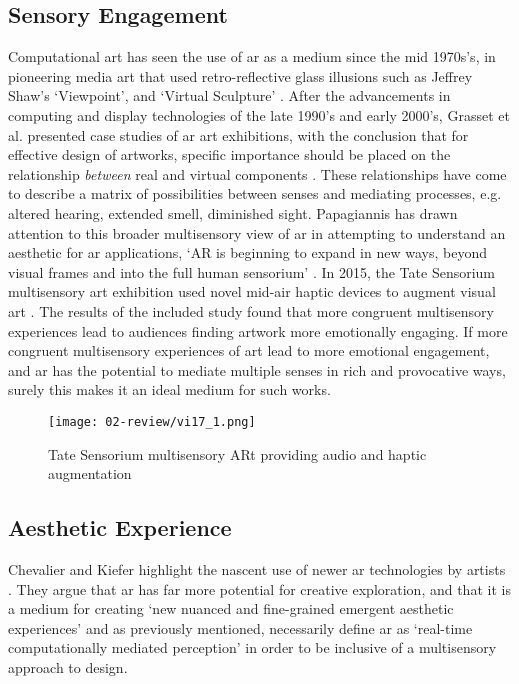 \subsection{Sensory Engagement}\label{sec: ar-arts-sensory}
Computational art has seen the use of \gls{ar} as a medium since the mid 1970s's, in pioneering media art that used retro-reflective glass illusions such as Jeffrey Shaw's `Viewpoint', and `Virtual Sculpture' \citeyearpar{shaw1975,shaw1981}. After the advancements in computing and display technologies of the late 1990's and early 2000's, Grasset et al. presented case studies of \gls{ar} art exhibitions, with the conclusion that for effective design of artworks, specific importance should be placed on the relationship \textit{between} real and virtual components \citeyearpar{grasset2008}. These relationships have come to describe a matrix of possibilities between senses and mediating processes, e.g. altered hearing, extended smell, diminished sight. Papagiannis has drawn attention to this broader multisensory view of \gls{ar} in attempting to understand an aesthetic for \gls{ar} applications, `AR is beginning to expand in new ways, beyond visual frames and into the full human sensorium' \citeyearpar{papagiannis2014}. In 2015, the Tate Sensorium multisensory art exhibition used novel mid-air haptic devices to augment visual art \citep{vi2017a}. The results of the included study found that more congruent multisensory experiences lead to audiences finding artwork more emotionally engaging. If more congruent multisensory experiences of art lead to more emotional engagement, and \gls{ar} has the potential to mediate multiple senses in rich and provocative ways, surely this makes it an ideal medium for such works. 

\begin{figure}[ht]
    \centering
    \texttt{[image: 02-review/vi17\_1.png]}
    \captionsetup{justification=centering,margin=1.5cm}
    \caption{Tate Sensorium multisensory ARt providing audio and haptic augmentation \citep[in][]{vi2017a}}\label{fig: tate}
\end{figure}

\subsection{Aesthetic Experience}\label{sec: ar-arts-aesthetics}
Chevalier and Kiefer highlight the nascent use of newer \gls{ar} technologies by artists \citeyearpar{chevalier2020}. They argue that \gls{ar} has far more potential for creative exploration, and that it is a medium for creating `new nuanced and fine-grained emergent aesthetic experiences' and as previously mentioned, necessarily define \gls{ar} as `real-time computationally mediated perception' in order to be inclusive of a multisensory approach to design. 

